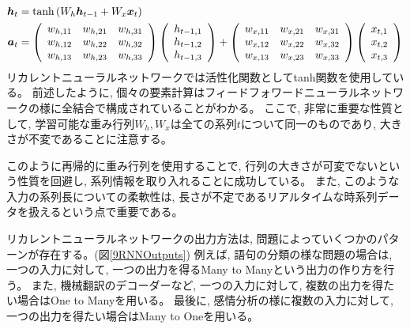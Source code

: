 \begin{equation}
 \begin{split}
  {\mbox{\boldmath{$h$}}}_t 
  &= \tanh{(W_h{\mbox{\boldmath{$h$}}}_{t-1}+W_x{\mbox{\boldmath{$x$}}}_t)}\\
  {\mbox{\boldmath{$a$}}}_t 
  &=
  \left(
    \begin{array}{ccc}
      w_{h,11} & w_{h,21} & w_{h,31} \\
      w_{h,12} & w_{h,22} & w_{h,32} \\
      w_{h,13} & w_{h,23} & w_{h,33}
    \end{array}
  \right)
  \left(
    \begin{array}{ccc}
      h_{t-1,1} \\
      h_{t-1,2} \\
      h_{t-1,3}
    \end{array}
  \right)
  +
  \left(
    \begin{array}{ccc}
      w_{x,11} & w_{x,21} & w_{x,31} \\
      w_{x,12} & w_{x,22} & w_{x,32} \\
      w_{x,13} & w_{x,23} & w_{x,33}
    \end{array}
  \right)
  \left(
    \begin{array}{ccc}
      x_{t,1} \\
      x_{t,2} \\
      x_{t,3}
    \end{array}
  \right)
 \end{split}
\end{equation}
リカレントニューラルネットワークでは活性化関数としてtanh関数を使用している。
前述したように, 個々の要素計算はフィードフォワードニューラルネットワークの様に全結合で構成されていることがわかる。
ここで, 非常に重要な性質として, 学習可能な重み行列$W_{h}, W_{x}$は全ての系列$t$について同一のものであり, 大きさが不変であることに注意する。

このように再帰的に重み行列を使用することで, 行列の大きさが可変でないという性質を回避し, 系列情報を取り入れることに成功している。
また, このような入力の系列長についての柔軟性は, 長さが不定であるリアルタイムな時系列データを扱えるという点で重要である。

リカレントニューラルネットワークの出力方法は, 問題によっていくつかのパターンが存在する。(図\ref{9RNNOutputs})
例えば, 語句の分類の様な問題の場合は, 一つの入力に対して, 一つの出力を得るMany to Manyという出力の作り方を行う。
また, 機械翻訳のデコーダーなど, 一つの入力に対して, 複数の出力を得たい場合はOne to Manyを用いる。
最後に, 感情分析の様に複数の入力に対して, 一つの出力を得たい場合はMany to Oneを用いる。

